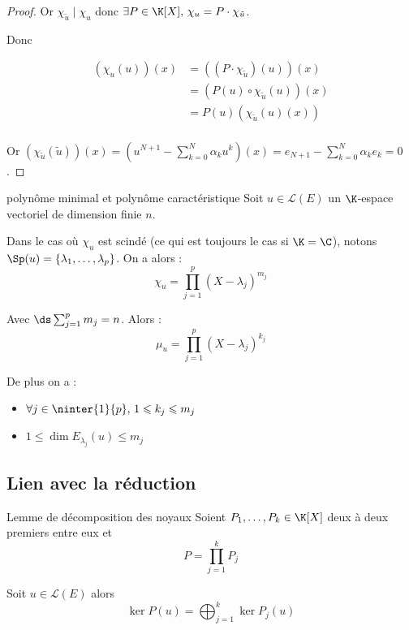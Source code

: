 \begin{proof}
    Or $\chi_{\tilde u} \mid \chi_u$ donc $\exists P \in \K[X], \, \chi_u = P \cdot \chi_{\tilde u}$.

    Donc 

    \begin{align}
        (\chi_u(u))(x) & = ((P \cdot \chi_{\tilde u})(u))(x) \\
        & = (P(u) \circ \chi_{\tilde u}(u))(x) \\
        & = P(u)(\chi_{\tilde u}(u)(x)) \\
    \end{align}

    Or $\displaystyle (\chi_{\tilde u}(\tilde u))(x) = (u^{N + 1} - \sum_{k = 0 }^{ N } \alpha_k u^k)(x) = e_{N + 1} - \sum_{k = 0 }^{ N } \alpha_k e_k = 0$.
\end{proof}

\begin{corollaire}{polynôme minimal et polynôme caractéristique}{}
    Soit $u \in \mathscr L(E)$ un $\K$-espace vectoriel de dimension finie $n$.

    Dans le cas où $\chi_u$ est scindé (ce qui est toujours le cas si $\K = \C$), 
    notons $\Sp(u) = \{\lambda_1, \ldots, \lambda_p\}$. On a alors : 
    $$\chi_u = \displaystyle \prod_{j = 1 }^{ p } (X - \lambda_j)^{m_j}$$

    Avec $\ds \sum_{j = 1 }^{p } m_j = n$.
    Alors : 
    $$\mu_u = \displaystyle \prod_{j = 1 }^{ p } (X - \lambda_j)^{k_j}$$

    De plus on a : 
    \begin{itemize}
        \item $\forall j \in \ninter{1}{p}, \, 1 \leqslant k_j \leqslant m_j$
        \item $1 \leqslant \dim E_{\lambda_j}(u) \leqslant m_j$ 
    \end{itemize}
\end{corollaire}

\subsection{Lien avec la réduction}

\begin{theoreme}{Lemme de décomposition des noyaux}{}
    Soient $P_1, \dots, P_k \in \K[X]$ deux à deux premiers entre eux et 
    $$P = \displaystyle \prod_{j = 1 }^{ k } P_j$$   
    
    Soit $u \in \mathscr L(E)$ alors 
    $$\displaystyle \ker P(u) = \bigoplus_{j = 1 }^{ k } \ker P_j(u)$$
\end{theoreme}

